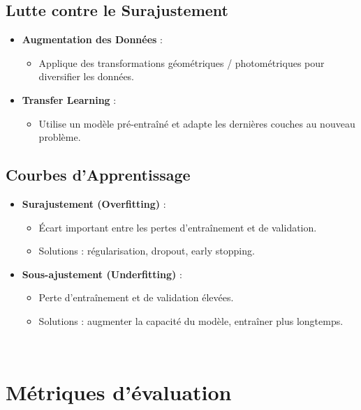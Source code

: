 \documentclass[a4paper,portrait]{article}
\begin{document}
\begin{multicols}{2}
\subsection{Lutte contre le Surajustement}

\begin{itemize}
    \item \textbf{Augmentation des Données} :
    \begin{itemize}
        \item Applique des transformations géométriques / photométriques pour diversifier les données.
    \end{itemize}

    \item \textbf{Transfer Learning} :
    \begin{itemize}
        \item Utilise un modèle pré-entraîné et adapte les dernières couches au nouveau problème.
    \end{itemize}
\end{itemize}



\subsection{Courbes d'Apprentissage}

\begin{itemize}
    \item \textbf{Surajustement (Overfitting)} :
    \begin{itemize}
        \item Écart important entre les pertes d'entraînement et de validation.
        \item Solutions : régularisation, dropout, early stopping.
    \end{itemize}

    \item \textbf{Sous-ajustement (Underfitting)} :
    \begin{itemize}
        \item Perte d'entraînement et de validation élevées.
        \item Solutions : augmenter la capacité du modèle, entraîner plus longtemps.
    \end{itemize}
\end{itemize}

\\
\section{Métriques d'évaluation}


\end{multicols}
\end{document}
